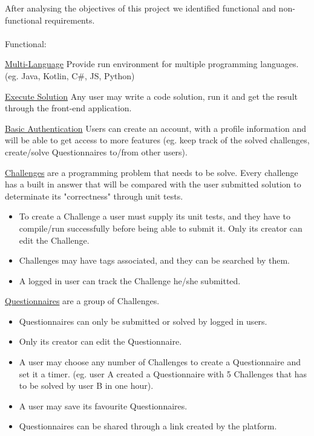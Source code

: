 \renewcommand{\labelitemii}{$\star$}
After analysing the objectives of this project we identified functional and non-functional requirements.
\\
\\
Functional:
\begin{description}[font=$\bullet$~\normalfont\scshape\color{red!50!black}]
\item \underline{Multi-Language} Provide run environment for multiple programming languages.(eg. Java, Kotlin, C\#, JS, Python)

\item \underline{Execute Solution} Any user may write a code solution, run it and get the result through the front-end application.

\item \underline {Basic Authentication} Users can create an account, with a profile information and will be able to get access to more features (eg. keep track of the solved challenges, create/solve Questionnaires to/from other users).

\item \underline{Challenges} are a programming problem that needs to be solve. Every challenge has a built in answer that will be compared with the user submitted solution to determinate its "correctness" through unit tests.
   \begin{itemize}
     \item To create a Challenge a user must supply its unit tests, and they have to compile/run successfully before being able to submit it. Only its creator can edit the Challenge.
     \item Challenges may have tags associated, and they can be searched by them.
     \item A logged in user can track the Challenge he/she submitted.
   \end{itemize}
\item \underline{Questionnaires} are a group of Challenges.
	\begin{itemize}
	\item Questionnaires can only be submitted or solved by logged in users.
	\item Only its creator can edit the Questionnaire.
    \item A user may choose any number of Challenges to create a Questionnaire and set it a timer. 
    (eg. user A created a Questionnaire with 5 Challenges that has to be solved by user B in one hour).
    \item A user may save its favourite Questionnaires.
    \item Questionnaires can be shared through a link created by the platform.
	\end{itemize}
\end{description}

